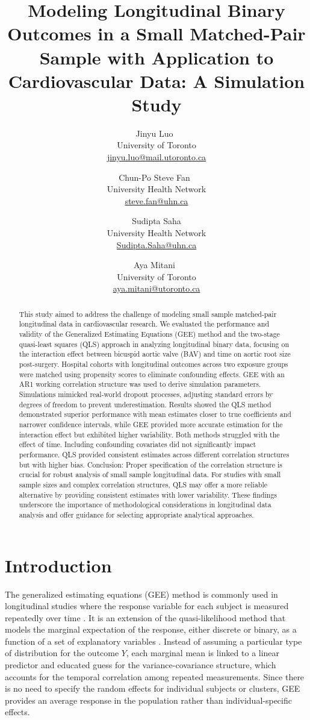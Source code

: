 \documentclass[
]{aft}
\title{Modeling Longitudinal Binary Outcomes in a Small Matched-Pair
Sample with Application to Cardiovascular Data: A Simulation Study}
\author{
Jinyu Luo~\orcidlink{0009-0004-1101-7040}\\University of
Toronto\\\href{mailto:jinyu.luo@mail.utoronto.ca}{jinyu.luo@mail.utoronto.ca}\and 
Chun-Po Steve Fan~\orcidlink{0000-0002-6373-0532}\\University Health
Network\\\href{mailto:steve.fan@uhn.ca}{steve.fan@uhn.ca}\and 
Sudipta Saha\\University Health
Network\\\href{mailto:Sudipta.Saha@uhn.ca}{Sudipta.Saha@uhn.ca}\and 
Aya Mitani~\orcidlink{0000-0002-0373-5032}\\University of
Toronto\\\href{mailto:aya.mitani@utoronto.ca}{aya.mitani@utoronto.ca}}
\date{}
\begin{document}
\maketitle
\begin{abstract}
This study aimed to address the challenge of modeling small sample
matched-pair longitudinal data in cardiovascular research. We evaluated
the performance and validity of the Generalized Estimating Equations
(GEE) method and the two-stage quasi-least squares (QLS) approach in
analyzing longitudinal binary data, focusing on the interaction effect
between bicuspid aortic valve (BAV) and time on aortic root size
post-surgery. Hospital cohorts with longitudinal outcomes across two
exposure groups were matched using propensity scores to eliminate
confounding effects. GEE with an AR1 working correlation structure was
used to derive simulation parameters. Simulations mimicked real-world
dropout processes, adjusting standard errors by degrees of freedom to
prevent underestimation. Results showed the QLS method demonstrated
superior performance with mean estimates closer to true coefficients and
narrower confidence intervals, while GEE provided more accurate
estimation for the interaction effect but exhibited higher variability.
Both methods struggled with the effect of time. Including confounding
covariates did not significantly impact performance. QLS provided
consistent estimates across different correlation structures but with
higher bias. Conclusion: Proper specification of the correlation
structure is crucial for robust analysis of small sample longitudinal
data. For studies with small sample sizes and complex correlation
structures, QLS may offer a more reliable alternative by providing
consistent estimates with lower variability. These findings underscore
the importance of methodological considerations in longitudinal data
analysis and offer guidance for selecting appropriate analytical
approaches.
\end{abstract}


\section{Introduction}\label{introduction}

The generalized estimating equations (GEE) method is commonly used in
longitudinal studies where the response variable for each subject is
measured repeatedly over time \citep{Liang1986}. It is an extension of
the quasi-likelihood method that models the marginal expectation of the
response, either discrete or binary, as a function of a set of
explanatory variables \citep{Agresti2nd}. Instead of assuming a
particular type of distribution for the outcome \(Y\), each marginal
mean is linked to a linear predictor and educated guess for the
variance-covariance structure, which accounts for the temporal
correlation among repeated measurements. Since there is no need to
specify the random effects for individual subjects or clusters, GEE
provides an average response in the population rather than
individual-specific effects.
\end{document}
